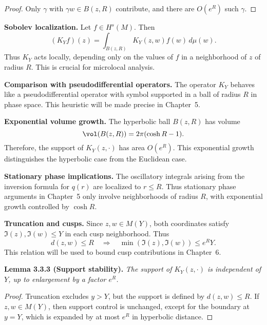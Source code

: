 \begin{proof}
Only $\gamma$ with $\gamma w\in B(z,R)$ contribute,
and there are $O(e^{R})$ such $\gamma$.
\end{proof}

\medskip

\noindent\textbf{Sobolev localization.}
Let $f\in H^{s}(M)$.
Then
\[
  (K_{Y}f)(z) = \int_{B(z,R)} K_{Y}(z,w)f(w)\,d\mu(w).
\]
Thus $K_{Y}$ acts locally,
depending only on the values of $f$ in a neighborhood of $z$ of radius $R$.
This is crucial for microlocal analysis.

\medskip

\noindent\textbf{Comparison with pseudodifferential operators.}
The operator $K_{Y}$ behaves like a pseudodifferential operator
with symbol supported in a ball of radius $R$ in phase space.
This heuristic will be made precise in Chapter~5.

\medskip

\noindent\textbf{Exponential volume growth.}
The hyperbolic ball $B(z,R)$ has volume
\[
  \vol(B(z,R)) = 2\pi(\cosh R -1).
\]
Therefore,
the support of $K_{Y}(z,\cdot)$ has area $O(e^{R})$.
This exponential growth distinguishes the hyperbolic case
from the Euclidean case.

\medskip

\noindent\textbf{Stationary phase implications.}
The oscillatory integrals arising from the inversion formula for $q(r)$
are localized to $r\le R$.
Thus stationary phase arguments in Chapter~5
only involve neighborhoods of radius $R$,
with exponential growth controlled by $\cosh R$.

\medskip

\noindent\textbf{Truncation and cusps.}
Since $z,w\in M(Y)$,
both coordinates satisfy $\Im(z),\Im(w)\le Y$ in each cusp neighborhood.
Thus
\[
  d(z,w)\le R \quad\Rightarrow\quad \min(\Im(z),\Im(w))\le e^{R}Y.
\]
This relation will be used to bound cusp contributions in Chapter~6.

\medskip

\noindent\textbf{Lemma 3.3.3 (Support stability).}
\emph{The support of $K_{Y}(z,\cdot)$ is independent of $Y$,
up to enlargement by a factor $e^{R}$.}

\begin{proof}
Truncation excludes $y>Y$,
but the support is defined by $d(z,w)\le R$.
If $z,w\in M(Y)$,
then support control is unchanged,
except for the boundary at $y=Y$,
which is expanded by at most $e^{R}$ in hyperbolic distance.
\end{proof}

